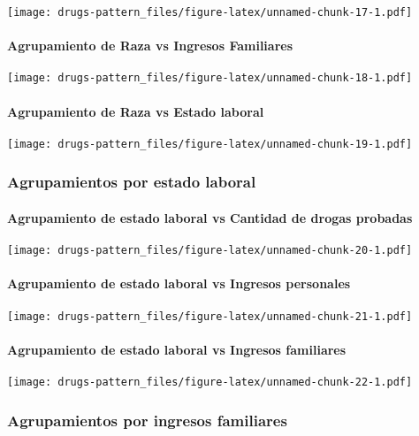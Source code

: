 \documentclass[]{article}
\let\oldparagraph\paragraph
\renewcommand{\paragraph}[1]{\oldparagraph{#1}\mbox{}}
\begin{document}
\texttt{[image: drugs-pattern\_files/figure-latex/unnamed-chunk-17-1.pdf]}

\paragraph{Agrupamiento de Raza vs Ingresos
Familiares}\label{agrupamiento-de-raza-vs-ingresos-familiares}

\texttt{[image: drugs-pattern\_files/figure-latex/unnamed-chunk-18-1.pdf]}

\paragraph{Agrupamiento de Raza vs Estado
laboral}\label{agrupamiento-de-raza-vs-estado-laboral}

\texttt{[image: drugs-pattern\_files/figure-latex/unnamed-chunk-19-1.pdf]}

\subsubsection{Agrupamientos por estado
laboral}\label{agrupamientos-por-estado-laboral}

\paragraph{Agrupamiento de estado laboral vs Cantidad de drogas
probadas}\label{agrupamiento-de-estado-laboral-vs-cantidad-de-drogas-probadas}

\texttt{[image: drugs-pattern\_files/figure-latex/unnamed-chunk-20-1.pdf]}

\paragraph{Agrupamiento de estado laboral vs Ingresos
personales}\label{agrupamiento-de-estado-laboral-vs-ingresos-personales}

\texttt{[image: drugs-pattern\_files/figure-latex/unnamed-chunk-21-1.pdf]}

\paragraph{Agrupamiento de estado laboral vs Ingresos
familiares}\label{agrupamiento-de-estado-laboral-vs-ingresos-familiares}

\texttt{[image: drugs-pattern\_files/figure-latex/unnamed-chunk-22-1.pdf]}

\subsubsection{Agrupamientos por ingresos
familiares}\label{agrupamientos-por-ingresos-familiares}
\end{document}
